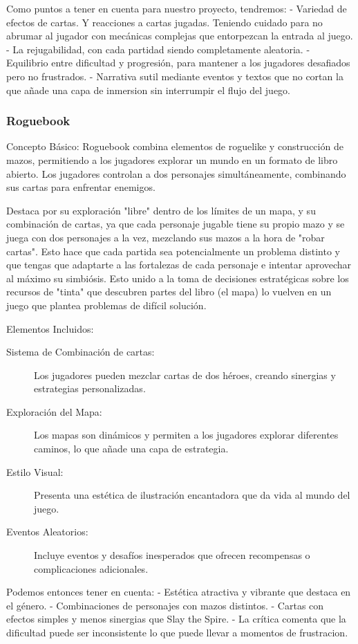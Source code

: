 Como puntos a tener en cuenta para nuestro proyecto, tendremos: 
- Variedad de efectos de cartas. Y reacciones a cartas jugadas. Teniendo cuidado para no abrumar al jugador con mecánicas complejas que entorpezcan la entrada al juego.
- La rejugabilidad, con cada partidad siendo completamente aleatoria.
- Equilibrio entre dificultad y progresión, para mantener a los jugadores desafiados pero no frustrados.
- Narrativa sutil mediante eventos y textos que no cortan la que añade una capa de inmersion sin interrumpir el flujo del juego.

\subsubsection{Roguebook}
Concepto Básico: Roguebook combina elementos de roguelike y construcción de mazos, permitiendo a los jugadores explorar un mundo en un formato de libro abierto. Los jugadores controlan a dos personajes simultáneamente, combinando sus cartas para enfrentar enemigos.

Destaca por su exploración "libre" dentro de los límites de un mapa, y su combinación de cartas, ya que cada personaje jugable tiene su propio mazo y se juega con dos personajes a la vez, mezclando sus mazos a la hora de "robar cartas". Esto hace que cada partida sea potencialmente un problema distinto y que tengas que adaptarte a las fortalezas de cada personaje e intentar aprovechar al máximo su simbiósis. Esto unido a la toma de decisiones estratégicas sobre los recursos de "tinta" que descubren partes del libro (el mapa) lo vuelven en un juego que plantea problemas de difícil solución.

Elementos Incluidos:
\begin{description}
    \item[Sistema de Combinación de cartas:] Los jugadores pueden mezclar cartas de dos héroes, creando sinergias y estrategias personalizadas.
    \item[Exploración del Mapa:] Los mapas son dinámicos y permiten a los jugadores explorar diferentes caminos, lo que añade una capa de estrategia.
    \item[Estilo Visual:] Presenta una estética de ilustración encantadora que da vida al mundo del juego.
    \item[Eventos Aleatorios:] Incluye eventos y desafíos inesperados que ofrecen recompensas o complicaciones adicionales. 
\end{description}

Podemos entonces tener en cuenta:
- Estética atractiva y vibrante que destaca en el género.
- Combinaciones de personajes con mazos distintos.
- Cartas con efectos simples y menos sinergias que Slay the Spire.
- La crítica comenta que la dificultad puede ser inconsistente lo que puede llevar a momentos de frustracion.


